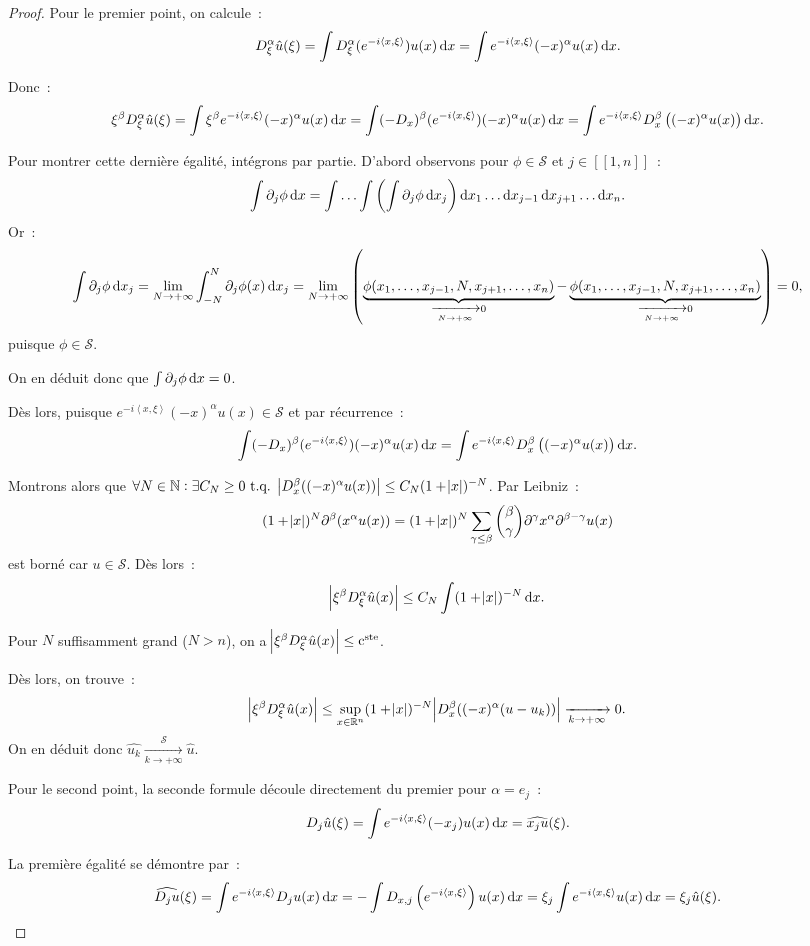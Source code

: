 \documentclass{report}
\newcommand{\R}{{\mathbb R}}
\newcommand{\N}{{\mathbb N}}
\newcommand{\scpr}[2]{\left\langle#1, #2\right\rangle}
\newcommand{\tq}{\text{ t.q. }}
\newcommand{\pinfty}{{+\infty}}
\newcommand{\intint}[2]{{[[#1, #2]]}}
\newcommand{\cste}{\text{c}^{\text{ste}}}
\newcommand{\dx}{\dif x}
\theoremstyle{definition}
\theoremstyle{remark}
\begin{document}
\begin{proof} Pour le premier point, on calcule~:
\[D^\alpha_\xi\hat u(\xi) = \int D^\alpha_\xi(e^{-i\scpr x\xi})u(x)\dif x = \int e^{-i\scpr x\xi}(-x)^\alpha u(x)\dif x.\]

Donc~:
\[\xi^\beta D^\alpha_\xi\hat u(\xi) = \int \xi^\beta e^{-i\scpr x\xi}(-x)^\alpha u(x)\dif x = \int (-D_x)^\beta(e^{-i\scpr x\xi})(-x)^\alpha u(x)\dif x
	= \int e^{-i\scpr x\xi} D^\beta_x\left((-x)^\alpha u(x)\right)\dif x.\]

Pour montrer cette dernière égalité, intégrons par partie. D'abord observons pour $\phi \in \mathcal S$ et $j \in \intint 1n$~:
\[\int \partial_j\phi\dx = \int\ldots\int\left(\int \partial_j\phi\dx_j\right)\dx_1\ldots\dx_{j-1}\dx_{j+1}\ldots\dx_n.\]
Or~:
\[\int \partial_j\phi\dx_j = \lim_{N \to \pinfty}\int_{-N}^N\partial_j\phi(x)\dx_j
	= \lim_{N \to \pinfty}\left(\underbrace {\phi(x_1, \ldots, x_{j-1}, N, x_{j+1}, \ldots, x_n)}_{\xrightarrow[N \to \pinfty]{} 0} - \underbrace {\phi(x_1, \ldots, x_{j-1}, N, x_{j+1}, \ldots, x_n)}_{\xrightarrow[N \to \pinfty]{} 0}\right) = 0,\]
puisque $\phi \in \mathcal S$.

On en déduit donc que $\int\partial_j\phi\dx = 0$.

Dès lors, puisque $e^{-i\scpr x\xi}(-x)^\alpha u(x) \in \mathcal S$ et par récurrence~:
\[\int (-D_x)^\beta(e^{-i\scpr x\xi})(-x)^\alpha u(x)\dif x	= \int e^{-i\scpr x\xi} D^\beta_x\left((-x)^\alpha u(x)\right)\dif x.\]

Montrons alors que $\forall N \in \N : \exists C_N \geq 0 \tq \abs {D_x^\beta((-x)^\alpha u(x))} \leq C_N(1 + \abs x)^{-N}$. Par Leibniz~:
\[(1 + \abs x)^N\partial^\beta (x^\alpha u(x)) = (1 + \abs x)^N\sum_{\gamma \leq \beta} \binom \beta\gamma\partial^\gamma x^\alpha\partial^{\beta-\gamma}u(x)\]
est borné car $u \in \mathcal S$. Dès lors~:
\[\abs {\xi^\beta D_\xi^\alpha \hat u(x)} \leq C_N\int(1 + \abs x)^{-N}\dx.\]

Pour $N$ suffisamment grand ($N > n$), on a $\abs {\xi^\beta D_\xi^\alpha \hat u(x)} \leq \cste$.

Dès lors, on trouve~:
\[\abs {\xi^\beta D_\xi^\alpha\hat u(x)} \leq \sup_{x \in \R^n}(1 + \abs x)^{-N}\abs {D_x^\beta((-x)^\alpha(u - u_k))} \xrightarrow[k \to \pinfty]{} 0.\]
On en déduit donc $\hat {u_k} \xrightarrow[k \to \pinfty]{\mathcal S} \hat u$.

Pour le second point, la seconde formule découle directement du premier pour $\alpha = e_j$~:
\[D_j\hat u(\xi) = \int e^{-i\scpr x\xi}(-x_j)u(x)\dx = \widehat {x_ju}(\xi).\]

La première égalité se démontre par~:
\[\widehat {D_ju}(\xi) = \int e^{-i\scpr x\xi} D_ju(x)\dx = -\int D_{x,j}\left(e^{-i\scpr x\xi}\right)u(x)\dx = \xi_j\int e^{-i\scpr x\xi}u(x)\dx = \xi_j\hat u(\xi).\]
\end{proof}
\end{document}
